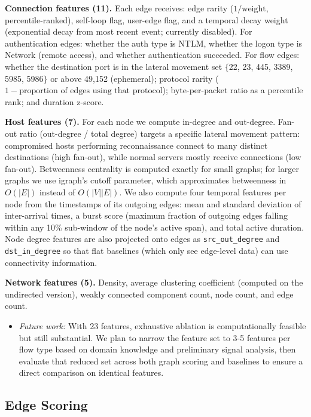 \textbf{Connection features (11).}
Each edge receives: edge rarity ($1 / \text{weight}$, percentile-ranked), self-loop flag, user-edge flag, and a temporal decay weight (exponential decay from most recent event; currently disabled). For authentication edges: whether the auth type is NTLM, whether the logon type is Network (remote access), and whether authentication succeeded. For flow edges: whether the destination port is in the lateral movement set $\{$22, 23, 445, 3389, 5985, 5986$\}$ or above 49,152 (ephemeral); protocol rarity ($1 - \text{proportion of edges using that protocol}$); byte-per-packet ratio as a percentile rank; and duration z-score.

\textbf{Host features (7).}
For each node we compute in-degree and out-degree. Fan-out ratio (out-degree / total degree) targets a specific lateral movement pattern: compromised hosts performing reconnaissance connect to many distinct destinations (high fan-out), while normal servers mostly receive connections (low fan-out). Betweenness centrality is computed exactly for small graphs; for larger graphs we use igraph's cutoff parameter, which approximates betweenness in $O(|E|)$ instead of $O(|V||E|)$. We also compute four temporal features per node from the timestamps of its outgoing edges: mean and standard deviation of inter-arrival times, a burst score (maximum fraction of outgoing edges falling within any 10\% sub-window of the node's active span), and total active duration. Node degree features are also projected onto edges as \texttt{src\_out\_degree} and \texttt{dst\_in\_degree} so that flat baselines (which only see edge-level data) can use connectivity information.

\textbf{Network features (5).}
Density, average clustering coefficient (computed on the undirected version), weakly connected component count, node count, and edge count.

\begin{itemize}
\item \textit{Future work:} With 23 features, exhaustive ablation is computationally feasible but still substantial. We plan to narrow the feature set to 3-5 features per flow type based on domain knowledge and preliminary signal analysis, then evaluate that reduced set across both graph scoring and baselines to ensure a direct comparison on identical features.
\end{itemize}

\subsection{Edge Scoring}

